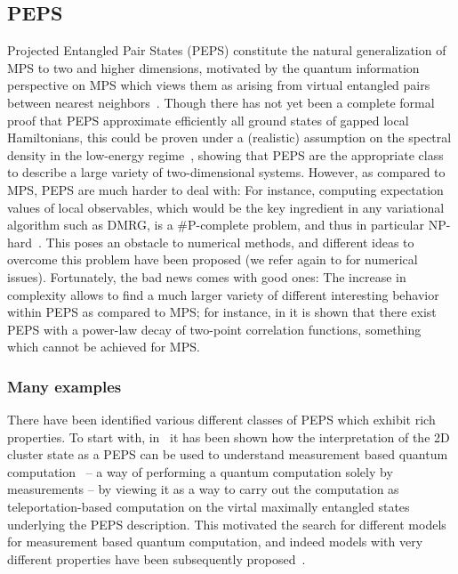 \documentclass{article}
\theoremstyle{plain}
\theoremstyle{definition}
\numberwithin{equation}{section}  %
\begin{document}
\subsection{PEPS}

Projected Entangled Pair States (PEPS) constitute the natural
generalization of MPS to two and higher dimensions, motivated by the
quantum information perspective on MPS which views them as arising from
virtual entangled pairs between nearest
neighbors~\cite{sierra:2d-dmrg,frank:2D-dmrg}.  Though there has not yet
been a complete formal proof that PEPS approximate
efficiently all ground states of gapped local Hamiltonians, this could be
proven under a (realistic) assumption on the spectral density in the
low-energy regime~\cite{hastings:locally}, showing that PEPS are the
appropriate class to describe a large variety of two-dimensional systems.
However, as compared to MPS, PEPS are much harder to deal with:
For instance, computing expectation values of local observables, which
would be the key ingredient in any variational algorithm such as DMRG, is a
\#P-complete problem, and thus in particular
NP-hard~\cite{schuch:cplx-of-PEPS}.  This poses an obstacle to numerical
methods, and different ideas to overcome this problem  have been proposed
(we refer again to \cite{murg:peps-review} for numerical issues).
Fortunately, the bad news comes with good ones: The increase in complexity
allows to find a much larger variety of different interesting behavior
within PEPS as compared to MPS; for instance, in
\cite{frank:comp-power-of-peps} it is shown that there exist PEPS with a
power-law decay of two-point correlation functions, something which cannot
be achieved for MPS.

\subsubsection{Many examples}

There have been identified various different classes of PEPS which exhibit rich
properties.  To start with, in~\cite{frank:mbc-peps} it has been shown how
the interpretation of the 2D cluster state as a PEPS can be used to
understand measurement based quantum
computation~\cite{raussendorf:cluster-short} -- a way of performing a
quantum computation solely by measurements -- by viewing it as a way to
carry out the computation as teleportation-based computation on the virtal
maximally entangled states underlying the PEPS description. This motivated
the search for different models for measurement based quantum computation,
and indeed models with very different properties have been subsequently
proposed~\cite{gross:mbqc-prl,gross:mbqc-pra,brennen:aklt-mbqc}.
\end{document}
